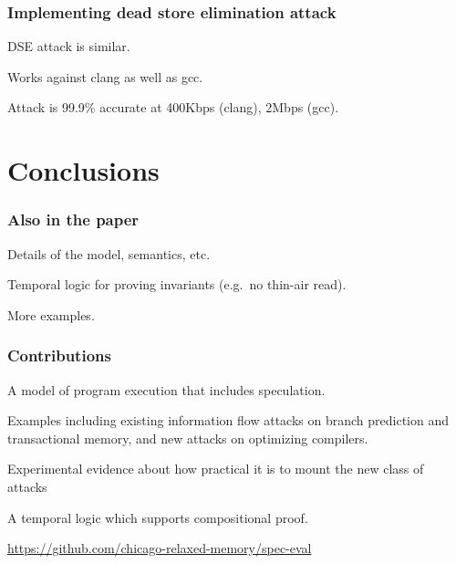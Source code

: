\documentclass{beamer}
\begin{document}
\begin{frame}
  \frametitle{Implementing dead store elimination attack}

  DSE attack is similar.

  \bigskip
  Works against clang as well as gcc.

  \bigskip
  Attack is 99.9\% accurate at 400Kbps (clang), 2Mbps (gcc).

\end{frame}

\section{Conclusions}
\begin{frame}
  \frametitle{Also in the paper}
  Details of the model, semantics, etc.

  \bigskip
  Temporal logic for proving invariants (e.g.~no thin-air read).

  \bigskip
  More examples.
\end{frame}
  
\begin{frame}
  \frametitle{Contributions}

  A model of program execution that includes speculation.

  \bigskip
  Examples
  including existing information flow attacks on
  branch prediction and transactional memory, and new attacks on optimizing compilers.

  \bigskip
  Experimental evidence about how practical it is to mount
  the new class of attacks

  \bigskip
  A temporal logic which supports compositional proof.

  \bigskip\footnotesize
  \url{https://github.com/chicago-relaxed-memory/spec-eval}

\end{frame}
\end{document}
